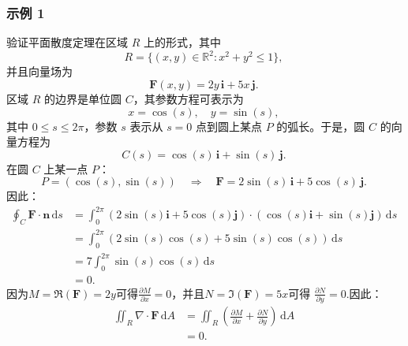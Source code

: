 \subsubsection{示例 1}
验证平面散度定理在区域 $R$ 上的形式，其中
$$
R = \{(x, y) \in \mathbb{R}^2 : x^2 + y^2 \le 1\},~
$$
并且向量场为
$$
\mathbf{F}(x, y) = 2y\,\mathbf{i} + 5x\,\mathbf{j}.~
$$
区域 $R$ 的边界是单位圆 $C$，其参数方程可表示为
$$
x = \cos(s), \quad y = \sin(s),~
$$
其中 $0 \le s \le 2\pi$，参数 $s$ 表示从 $s=0$ 点到圆上某点 $P$ 的弧长。于是，圆 $C$ 的向量方程为
$$
C(s) = \cos(s)\,\mathbf{i} + \sin(s)\,\mathbf{j}.~
$$
在圆 $C$ 上某一点 $P$：
$$
P = (\cos(s), \sin(s)) \quad \Rightarrow \quad 
\mathbf{F} = 2\sin(s)\,\mathbf{i} + 5\cos(s)\,\mathbf{j}.~
$$
因此：
$$
\begin{aligned}
\oint_{C} \mathbf{F} \cdot \mathbf{n}\, \mathrm{d}s
&= \int_{0}^{2\pi} 
\left( 2\sin(s)\mathbf{i} + 5\cos(s)\mathbf{j} \right) 
\cdot 
\left( \cos(s)\mathbf{i} + \sin(s)\mathbf{j} \right)
\,\mathrm{d}s \\[6pt]
&= \int_{0}^{2\pi} 
\left( 2\sin(s)\cos(s) + 5\sin(s)\cos(s) \right)
\,\mathrm{d}s \\[6pt]
&= 7 \int_{0}^{2\pi} 
\sin(s)\cos(s)
\,\mathrm{d}s \\[6pt]
&= 0.
\end{aligned}~
$$
因为$M = \Re(\mathbf{F}) = 2y$可得$\frac{\partial M}{\partial x} = 0$，并且$N = \Im(\mathbf{F}) = 5x$可得
$\frac{\partial N}{\partial y} = 0$.因此：
$$
\begin{aligned}
\iint_{R} 
\nabla \cdot \mathbf{F}
\,\mathrm{d}A
&= 
\iint_{R} 
\left(
\frac{\partial M}{\partial x} 
+ 
\frac{\partial N}{\partial y}
\right)
\,\mathrm{d}A \\[6pt]
&= 
0.
\end{aligned}~
$$
